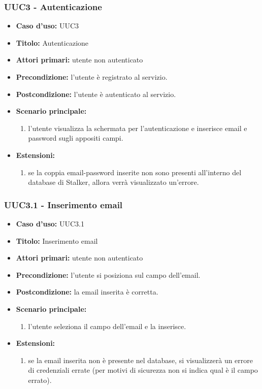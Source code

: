 \documentclass[casi-duso]{subfiles}
\begin{document}
\subsubsection{UUC3 - Autenticazione}
\label{subsub:UUC2utente}
\begin{itemize}
  \item \textbf{Caso d’uso:} UUC3 
  \item \textbf{Titolo:} Autenticazione
  \item \textbf{Attori primari:} utente non autenticato
  \item \textbf{Precondizione:} l'utente è registrato al servizio.
  \item \textbf{Postcondizione:} l'utente è autenticato al servizio.
  \item \textbf{Scenario principale:} 
  \begin{enumerate}
    \item l'utente visualizza la schermata per l'autenticazione e inserisce email e password sugli appositi campi.
  \end{enumerate}  
  \item \textbf{Estensioni:} 
  \begin{enumerate}
    \item se la coppia email-password inserite non sono presenti all'interno del database di Stalker, allora verrà visualizzato un'errore.
  \end{enumerate}  
\end{itemize}

\subsubsection{UUC3.1 - Inserimento email}
\label{subsub:UUC2.1utente}
\begin{itemize}
  \item \textbf{Caso d’uso:} UUC3.1 
  \item \textbf{Titolo:} Inserimento email
  \item \textbf{Attori primari:} utente non autenticato
  \item \textbf{Precondizione:} l'utente si posiziona sul campo dell'email.
  \item \textbf{Postcondizione:} la email inserita è corretta.
  \item \textbf{Scenario principale:} 
  \begin{enumerate}
    \item l'utente seleziona il campo dell'email e la inserisce.
  \end{enumerate}  
  \item \textbf{Estensioni:} 
  \begin{enumerate}
    \item se la email inserita non è presente nel database, si visualizzerà un errore di credenziali errate (per motivi di sicurezza
    non si indica qual è il campo errato).
  \end{enumerate}  
\end{itemize}
\end{document}
